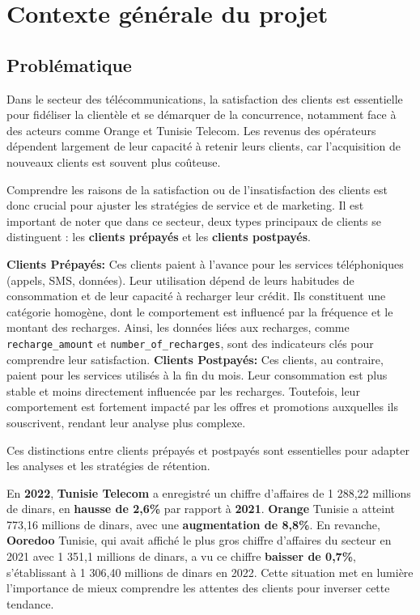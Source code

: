 \section{Contexte générale du projet}
\subsection{Problématique}

Dans le secteur des télécommunications, la satisfaction des clients est essentielle pour fidéliser la clientèle et se démarquer de la concurrence, notamment face à des acteurs comme Orange et Tunisie Telecom. Les revenus des opérateurs dépendent largement de leur capacité à retenir leurs clients, car l’acquisition de nouveaux clients est souvent plus coûteuse.\par

Comprendre les raisons de la satisfaction ou de l'insatisfaction des clients est donc crucial pour ajuster les stratégies de service et de marketing. Il est important de noter que dans ce secteur, deux types principaux de clients se distinguent : les \textbf{clients prépayés} et les \textbf{clients postpayés}.

\textbf{Clients Prépayés:} Ces clients paient à l'avance pour les services téléphoniques (appels, SMS, données). Leur utilisation dépend de leurs habitudes de consommation et de leur capacité à recharger leur crédit. Ils constituent une catégorie homogène, dont le comportement est influencé par la fréquence et le montant des recharges. Ainsi, les données liées aux recharges, comme \texttt{recharge\_amount} et \texttt{number\_of\_recharges}, sont des indicateurs clés pour comprendre leur satisfaction.
\textbf{Clients Postpayés:} Ces clients, au contraire, paient pour les services utilisés à la fin du mois. Leur consommation est plus stable et moins directement influencée par les recharges. Toutefois, leur comportement est fortement impacté par les offres et promotions auxquelles ils souscrivent, rendant leur analyse plus complexe.

Ces distinctions entre clients prépayés et postpayés sont essentielles pour adapter les analyses et les stratégies de rétention.

En \textbf{2022}, \textbf{Tunisie Telecom} a enregistré un chiffre d’affaires de 1 288,22 millions de dinars, en \textbf{hausse de 2,6\%} par rapport à \textbf{2021}. \textbf{Orange} Tunisie a atteint 773,16 millions de dinars, avec une \textbf{augmentation de 8,8\%}. En revanche, \textbf{Ooredoo} Tunisie, qui avait affiché le plus gros chiffre d’affaires du secteur en 2021 avec 1 351,1 millions de dinars, a vu ce chiffre \textbf{baisser de 0,7\%}, s'établissant à 1 306,40 millions de dinars en 2022. Cette situation met en lumière l'importance de mieux comprendre les attentes des clients pour inverser cette tendance.\par


